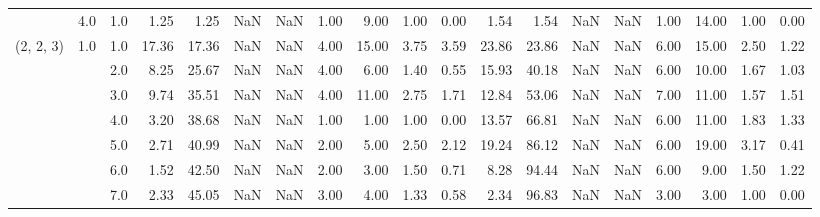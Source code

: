\begin{tabular}{lllrrrrrrrrrrrrrrrr}
          & 4.0 & 1.0  &      1.25 &       1.25 &               NaN &                NaN &  1.00 &   9.00 &             1.00 &                         0.00 &      1.54 &       1.54 &               NaN &                NaN &  1.00 &  14.00 &             1.00 &                         0.00 \\
(2, 2, 3) & 1.0 & 1.0  &     17.36 &      17.36 &               NaN &                NaN &  4.00 &  15.00 &             3.75 &                         3.59 &     23.86 &      23.86 &               NaN &                NaN &  6.00 &  15.00 &             2.50 &                         1.22 \\
          &     & 2.0  &      8.25 &      25.67 &               NaN &                NaN &  4.00 &   6.00 &             1.40 &                         0.55 &     15.93 &      40.18 &               NaN &                NaN &  6.00 &  10.00 &             1.67 &                         1.03 \\
          &     & 3.0  &      9.74 &      35.51 &               NaN &                NaN &  4.00 &  11.00 &             2.75 &                         1.71 &     12.84 &      53.06 &               NaN &                NaN &  7.00 &  11.00 &             1.57 &                         1.51 \\
          &     & 4.0  &      3.20 &      38.68 &               NaN &                NaN &  1.00 &   1.00 &             1.00 &                         0.00 &     13.57 &      66.81 &               NaN &                NaN &  6.00 &  11.00 &             1.83 &                         1.33 \\
          &     & 5.0  &      2.71 &      40.99 &               NaN &                NaN &  2.00 &   5.00 &             2.50 &                         2.12 &     19.24 &      86.12 &               NaN &                NaN &  6.00 &  19.00 &             3.17 &                         0.41 \\
          &     & 6.0  &      1.52 &      42.50 &               NaN &                NaN &  2.00 &   3.00 &             1.50 &                         0.71 &      8.28 &      94.44 &               NaN &                NaN &  6.00 &   9.00 &             1.50 &                         1.22 \\
          &     & 7.0  &      2.33 &      45.05 &               NaN &                NaN &  3.00 &   4.00 &             1.33 &                         0.58 &      2.34 &      96.83 &               NaN &                NaN &  3.00 &   3.00 &             1.00 &                         0.00 \\

\end{tabular}
